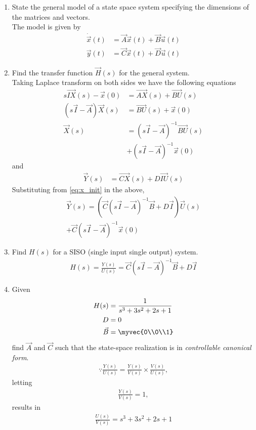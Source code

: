 \begin{enumerate}[label=\thesection.\arabic*.,ref=\thesection.\theenumi]
\item State the general model of a state space system specifying the dimensions of the matrices and vectors.
\\
\solution The model is given by 
\begin{align}
\dot{\vec{x}}(t)&=\vec{A}\vec{x}(t)+\vec{B}\vec{u}(t) \\
 \vec{y}(t)&=\vec{C}\vec{x}(t)+\vec{D} \vec{u}(t)
\end{align}

\item Find the transfer function $\vec{H}(s)$ for the general system.
\\
\solution 
Taking Laplace transform on both sides we have the following equations
\begin{align*}
 s\vec{IX}(s)-\vec{x}(0)&= \vec{AX}(s)+ \vec{BU}(s)\\
(s\vec{I}-\vec{A})\vec{X}(s)&= \vec{BU}(s)+ \vec{x}(0)\\
\vec{X}(s)&={(s\vec{I}-\vec{A})^{-1}}\vec{B U}(s)\\
& +(s\vec{I}-\vec{A})^{-1}\vec{x}(0)
\label{eq:x_init}
\end{align*}
and
\begin{align}
\vec{Y}(s)&= \vec{CX}(s)+D\vec{IU}(s)
\end{align}
Substituting from \eqref{eq:x_init} in the above,
%
\begin{multline}
\vec{Y}(s)=( \vec{C}{(s\vec{I}-\vec{A})^{-1}}\vec{B}+D\vec{I}) \vec{U}(s) 
\\
+ \vec{C}(s\vec{I}-\vec{A})^{-1}\vec{x}(0)
\end{multline}
%
\item Find $H(s)$ for a SISO (single input single output) system.
\\
\solution
\begin{align}
H(s)= {\frac{Y(s)}{U(s)}}= \vec{C}{(s\vec{I}-\vec{A})^{-1}}\vec{B}+D\vec{I}
\end{align}

\item Given 
\begin{align}
H(s)&=\frac{1}{s^3+3s^2+2s+1}
\\
D&=0
\\
\vec{B}&= \myvec{0\\0\\1}
\end{align}
%
 find $\vec{A}$ and $\vec{C}$ such that the state-space realization is in {\em controllable canonical form}.
\\
\solution 
\begin{align} 
\because {\frac{Y(s)}{U(s)}}= \frac{Y(s)}{V(s)} \times \frac{V(s)}{U(s)},
\end{align}
letting
\begin{align}
 {\frac{Y(s)}{V(s)}}= 1, 
\end{align}
results in 
\begin{align}
{\frac{U(s)}{V(s)}}={s^3 + 3s^2+2s + 1}
\end{align}


\end{enumerate}
